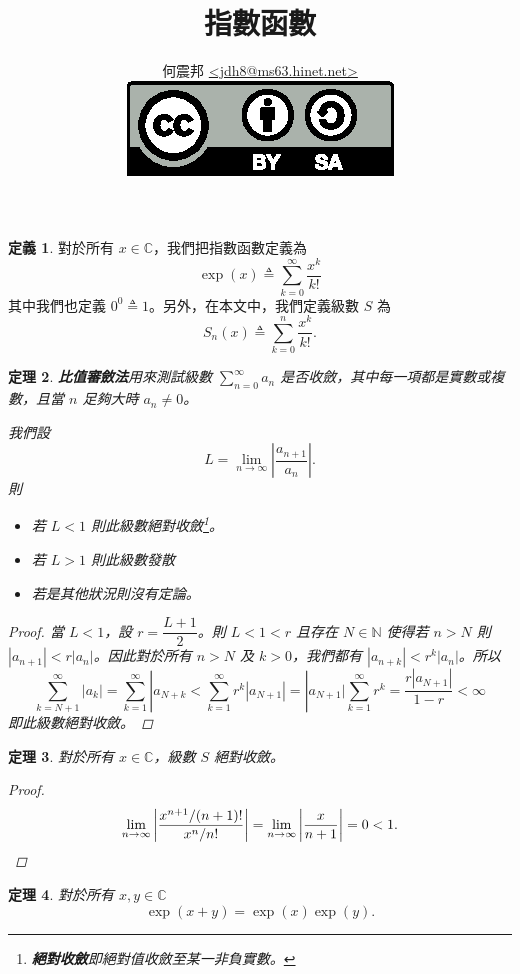 \documentclass[a4paper]{article}
\title{指數函數}
\author{何震邦 \href{mailto:jdh8@ms63.hinet.net}{\textless jdh8@ms63.hinet.net\textgreater}\\
    \href{http://creativecommons.org/licenses/by-sa/3.0/tw/deed.zh\textunderscore TW}{\includegraphics{by-sa.eps}}}
\newcommand  {\N}{\mathbb N}
\renewcommand{\C}{\mathbb C}
\theoremstyle{plain}
\newtheorem{theorem}{定理}
\theoremstyle{definition}
\newtheorem{definition}[theorem]{定義}
\theoremstyle{remark}
\begin{document}
\begin{CJK}{UTF8}{bsmi}
\maketitle

\begin{definition} \label{def:exp}
  對於所有 $x \in \C$，我們把指數函數定義為
  \[\exp(x) \triangleq \sum_{k=0}^{\infty} \frac{x^k}{k!}\]
  其中我們也定義 $0^0 \triangleq 1$。另外，在本文中，我們定義級數 $S$ 為
  \[S_n(x) \triangleq \sum_{k=0}^n \frac{x^k}{k!}.\]
\end{definition}

\begin{theorem}
  \textbf{比值審斂法}用來測試級數 $\displaystyle \sum_{n=0}^\infty a_n$ 是否收斂，其中每一項都是實數或複數，且當 $n$
  足夠大時 $a_n \ne 0$。

  我們設
  \[L = \lim_{n \to \infty} \left| \frac{a_{n+1}}{a_n} \right|.\]
  則
  \begin{itemize}
    \item 若 $L < 1$ 則此級數絕對收斂\footnote{\textbf{絕對收斂}即絕對值收斂至某一非負實數。}。
    \item 若 $L > 1$ 則此級數發散
    \item 若是其他狀況則沒有定論。
  \end{itemize}

  \begin{proof}
    當 $L < 1$，設 $r = \dfrac{L+1}{2}$。則 $L < 1 < r$ 且存在 $N \in \N$ 使得若 $n > N$ 則 $|a_{n+1}| < r \left| a_n
    \right|$。因此對於所有 $n > N$ 及 $k > 0$，我們都有 $|a_{n+k}| < r^k \left| a_n \right|$。所以
    \[\sum_{k=N+1}^\infty |a_k| = \sum_{k=1}^\infty |a_{N+k} < \sum_{k=1}^\infty r^k \left| a_{N+1} \right| = |a_{N+1}|
    \sum_{k=1}^\infty r^k = \frac{r \left| a_{N+1} \right|}{1-r} < \infty\]
    即此級數絕對收斂。
  \end{proof}
\end{theorem}

\begin{theorem}
  對於所有 $x \in \C$，級數 $S$ 絕對收斂。
  \begin{proof}
    \[\lim_{n \to \infty} \left| \frac{x^{n+1} / (n+1)!}{x^n / n!} \right| = \lim_{n \to \infty} \left| \frac{x}{n+1}
    \right| = 0 < 1. \qedhere\]
  \end{proof}
\end{theorem}

\begin{theorem}
  對於所有 $x,y \in \C$
  \[\exp(x+y) = \exp(x) \exp(y).\]


\end{theorem}
\end{CJK}
\end{document}

